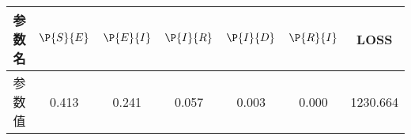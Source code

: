 \begin{tabular}{ccccccc}
\hline
参数名&$\P{S}{E}$&$\P{E}{I}$&$\P{I}{R}$&$\P{I}{D}$&$\P{R}{I}$&LOSS\\
\hline
参数值&0.413&0.241&0.057&0.003&0.000&1230.664\\
\hline
\end{tabular}